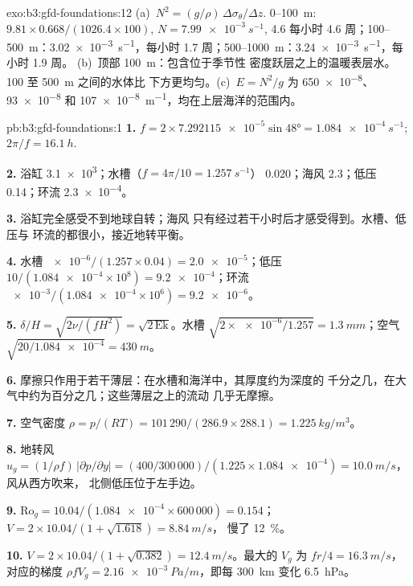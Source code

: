 \begin{solution}{exo:b3:gfd-foundations:12}
(a)~$N^2 = (g/\rho)\,\Delta\sigma_\theta/\Delta z$. 0--\qty{100}{m}:
$9.81\times0.668/(1026.4\times100)$, $N = \qty{7.99e-3}{s^{-1}}$, 4.6
每小时 4.6 周；100--\qty{500}{m}：\qty{3.02e-3}{s^{-1}}，每小时 1.7
周；500--\qty{1000}{m}：\qty{3.24e-3}{s^{-1}}，每小时 1.9 周。
(b)~顶部 \qty{100}{m}：包含位于季节性
密度跃层之上的温暖表层水。100 至 \qty{500}{m} 之间的水体比
下方更均匀。(c)~$E = N^2/g$ 为 \num{650e-8}、\num{93e-8} 和
\qty{107e-8}{m^{-1}}，均在上层海洋的范围内。
\end{solution}

\begin{solution}{pb:b3:gfd-foundations:1}
\textbf{1.} $f = 2\times\num{7.292115e-5}\sin\ang{48} =
\qty{1.084e-4}{s^{-1}}$; $2\pi/f = \qty{16.1}{h}$.

\textbf{2.} 浴缸 \num{3.1e3}；水槽（$f = 4\pi/10 = \qty{1.257}{s^{-1}}$）
0.020；海风 2.3；低压 0.14；环流 \num{2.3e-4}。

\textbf{3.} 浴缸完全感受不到地球自转；海风
只有经过若干小时后才感受得到。水槽、低压与
环流的都很小，接近地转平衡。

\textbf{4.} 水槽 $\num{e-6}/(1.257\times0.04) = \num{2.0e-5}$；低压 
$10/(\num{1.084e-4}\times10^8) = \num{9.2e-4}$；环流 
$\num{e-3}/(\num{1.084e-4}\times10^6) = \num{9.2e-6}$。

\textbf{5.} $\delta/H = \sqrt{2\nu/(fH^2)} = \sqrt{2\,\mathrm{Ek}}$。水槽 
$\sqrt{2\times\num{e-6}/1.257} = \qty{1.3}{mm}$；空气 $\sqrt{20/\num{1.084e-4}}
= \qty{430}{m}$。

\textbf{6.} 摩擦只作用于若干薄层：在水槽和海洋中，其厚度约为深度的
千分之几，在大气中约为百分之几；这些薄层之上的流动
几乎无摩擦。

\textbf{7.} 空气密度 $\rho = p/(RT) = 101\,290/(286.9\times288.1) =
\qty{1.225}{kg/m^3}$。

\textbf{8.} 地转风 $u_g = (1/\rho f)\,|\partial p/\partial y| = (400/300\,000)/(1.225
\times\num{1.084e-4}) = \qty{10.0}{m/s}$，风从西方吹来，
北侧低压位于左手边。

\textbf{9.} $\mathrm{Ro}_g = 10.04/(\num{1.084e-4}\times600\,000) = 0.154$；
$V = 2\times10.04/(1 + \sqrt{1.618}) = \qty{8.84}{m/s}$，
慢了 \qty{12}{\percent}。

\textbf{10.} $V = 2\times10.04/(1 + \sqrt{0.382}) = \qty{12.4}{m/s}$。最大的 
$V_g$ 为 $fr/4 = \qty{16.3}{m/s}$，对应的梯度 $\rho fV_g =
\qty{2.16e-3}{Pa/m}$，即每 \qty{300}{km} 变化 \qty{6.5}{hPa}。


\end{solution}
